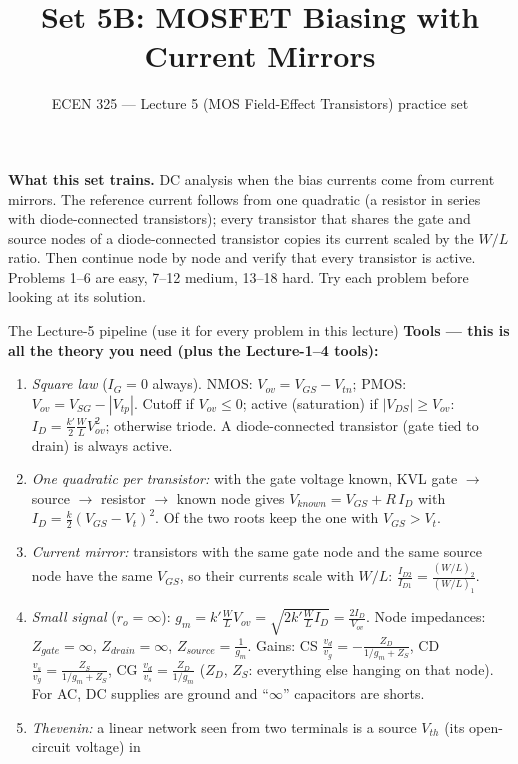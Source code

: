 \documentclass[11pt]{article}
\title{Set 5B: MOSFET Biasing with Current Mirrors}
\author{ECEN 325 --- Lecture 5 (MOS Field-Effect Transistors) practice set}
\date{}
\begin{document}
\maketitle

\textbf{What this set trains.} DC analysis when the bias currents come from current mirrors. The reference current
follows from one quadratic (a resistor in series with diode-connected transistors); every transistor that shares the
gate and source nodes of a diode-connected transistor copies its current scaled by the $W/L$ ratio. Then continue
node by node and verify that every transistor is active. Problems 1--6 are easy, 7--12 medium, 13--18 hard. Try each
problem before looking at its solution.


\begin{cardbox}{The Lecture-5 pipeline (use it for every problem in this lecture)}
\textbf{Tools --- this is all the theory you need (plus the Lecture-1--4 tools):}
\begin{enumerate}[label=\textbf{T\arabic*},leftmargin=2.2em,itemsep=1pt]
\item \emph{Square law} ($I_G = 0$ always). NMOS: $V_{ov} = V_{GS} - V_{tn}$; PMOS: $V_{ov} = V_{SG} - |V_{tp}|$.
      Cutoff if $V_{ov}\le 0$; active (saturation) if $|V_{DS}| \ge V_{ov}$:
      $I_D = \frac{k'}{2}\frac{W}{L}V_{ov}^2$; otherwise triode.
      A diode-connected transistor (gate tied to drain) is always active.
\item \emph{One quadratic per transistor:} with the gate voltage known, KVL gate $\to$ source $\to$ resistor $\to$
      known node gives $V_{known} = V_{GS} + R\,I_D$ with $I_D = \frac{k}{2}(V_{GS}-V_t)^2$. Of the two roots keep
      the one with $V_{GS} > V_t$.
\item \emph{Current mirror:} transistors with the same gate node and the same source node have the same $V_{GS}$,
      so their currents scale with $W/L$: $\frac{I_{D2}}{I_{D1}} = \frac{(W/L)_2}{(W/L)_1}$.
\item \emph{Small signal} ($r_o = \infty$): $g_m = k'\frac{W}{L}V_{ov} = \sqrt{2k'\frac{W}{L}I_D} = \frac{2I_D}{V_{ov}}$.
      Node impedances: $Z_{gate} = \infty$, $Z_{drain} = \infty$, $Z_{source} = \frac{1}{g_m}$. Gains: CS
      $\frac{v_d}{v_g} = -\frac{Z_D}{1/g_m + Z_S}$, CD $\frac{v_s}{v_g} = \frac{Z_S}{1/g_m + Z_S}$, CG
      $\frac{v_d}{v_s} = \frac{Z_D}{1/g_m}$ ($Z_D$, $Z_S$: everything else hanging on that node). For AC, DC supplies
      are ground and ``$\infty$'' capacitors are shorts.
\item \emph{Thevenin:} a linear network seen from two terminals is a source $V_{th}$ (its open-circuit voltage) in

\end{enumerate}
\end{cardbox}
\end{document}
